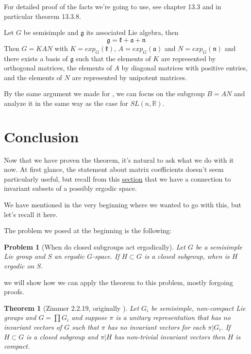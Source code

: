 \documentclass[
  12pt
]{article}
\newtheorem{thm}{Theorem}[section]
\newtheorem*{problem}{Problem}
\theoremstyle{plain}
\newcommand{\G}{\ensuremath{G}\xspace}
\newcommand{\mpi}{\ensuremath{\pi}\xspace}
\newcommand{\slnr}{\ensuremath{SL(n, \mathbb{R})}\xspace}
\newcommand{\frg}{\ensuremath{\mathfrak{g}}\xspace}
\newcommand{\frk}{\ensuremath{\mathfrak{k}}\xspace}
\newcommand{\fra}{\ensuremath{\mathfrak{a}}\xspace}
\newcommand{\frnn}{\ensuremath{\mathfrak{n}}\xspace}
\begin{document}
   For detailed proof of the facts we're going to use, see \citeauthor{Hilgert2012}\cite{Hilgert2012} chapter 13.3 and in particular theorem 13.3.8.
   
   Let \G be semisimple and $\mathfrak{g}$ its associated Lie algebra, then 
   $$\frg = \frk + \fra + \frnn$$
   Then $G =KAN$ with $K=exp_G(\frk)$, $A=exp_G(\fra)$ and $N=exp_G(\frnn)$
   and there exists a basis of \frg such that the elements of $K$ are represented by orthogonal matrices, the elements of $A$ by diagonal matrices with positive entries, and the elements of $N$ are represented by unipotent matrices.

   By the same argument we made for , we can focus on the subgroup $B=AN$ and analyze it in the same way as the case for \slnr.




\hypertarget{outro}{%
\section{Conclusion}\label{outro}}


  Now that we have proven the theorem, it's natural to ask what we do with it now.
  At first glance, the statement about matrix coefficients doesn't seem particularly useful,
  but recall from this \hyperref[the-connection-between-ergodicity-and-unitary-representations]{section}
  that we have a connection to invariant subsets of a possibly ergodic space.

  We have mentioned in the very beginning where we wanted to go with this, but let's recall it here.

  The problem we posed at the beginning is the following:

  \begin{problem}[When do closed subgroups act ergodically]
    Let \G be a semisimple Lie group and $S$ an ergodic \G-space. If $H\subset G$ is a closed subgroup, when is $H$ ergodic on $S$.
  \end{problem}

  we will show how we can apply the theorem to this problem, mostly forgoing proofs.

  \begin{thm}[Zimmer 2.2.19, originally \citeauthor{Moore66}\cite{Moore66}]
    \label{thm:2.2.19}
     Let $G_i$ be semisimple, non-compact Lie groups and $G = \prod G_i$ and
     suppose \mpi is a unitary representation that has no invariant vectors of
     \G such that \mpi has no invariant vectors for each $\pi|G_i$. If $H
     \subset G$ is a closed subgroup and $\pi|H$ has non-trivial invariant
     vectors then $H$ is compact.
  \end{thm}
\end{document}
